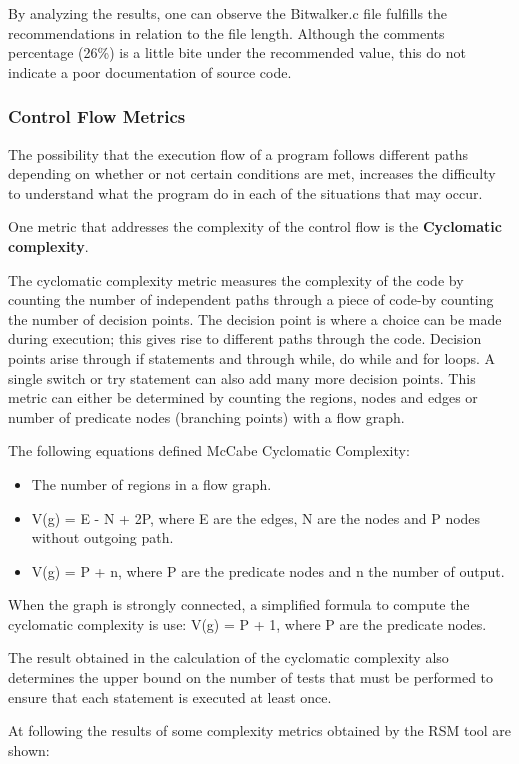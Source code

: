 By analyzing the results, one can observe the Bitwalker.c file fulfills the recommendations in relation to the file length. Although the comments percentage (26\%) is a little bite under the recommended value, this do not indicate a poor documentation of source code.

\subsubsection{Control Flow Metrics}
\label{sec:cyclo}
The possibility that the execution flow of a program follows different paths depending on whether or not certain conditions are met, increases the difficulty to understand what the program do in each of the situations that may occur.

One metric that addresses the complexity of the control flow is the \textbf{Cyclomatic complexity}. 

The cyclomatic complexity metric measures the complexity of the code by counting the number of independent paths through a piece of code-by counting the number of decision points. The decision point is where a choice can be made during execution; this gives rise to different paths through the code. Decision points arise through if statements and through while, do while and for loops. A single switch or try statement can also add many more decision points. This metric can either be determined by counting the regions, nodes and edges or number of predicate nodes (branching points) with a flow graph.


The following equations defined McCabe Cyclomatic Complexity: 
\begin{itemize}
\item The number of regions in a flow graph.
\item V(g) = E - N + 2P, where E are the edges, N are the nodes and P nodes without outgoing path.
\item V(g) = P + n, where P are the predicate nodes and n the number of output.
\end{itemize}

When the graph is strongly connected, a simplified formula to compute the cyclomatic complexity is use: V(g) = P + 1, where P are the predicate nodes.

The result obtained in the calculation of the cyclomatic complexity also determines the upper bound on the number of tests that must be performed to ensure that each statement is executed at least once.

At following the results of some complexity metrics obtained by the RSM tool are shown:

